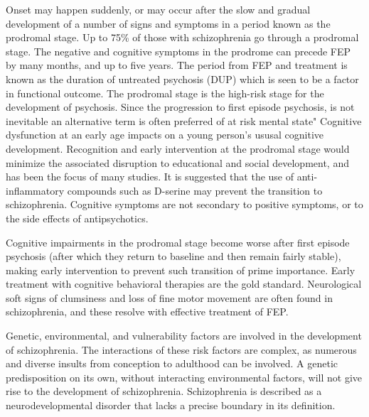 Onset may happen suddenly, or may occur after the slow and gradual
development of a number of signs and symptoms in a period known as the
prodromal stage. Up to 75\% of those with schizophrenia go through a
prodromal stage. The negative and cognitive symptoms in the prodrome can
precede FEP by many months, and up to five years. The period from FEP
and treatment is known as the duration of untreated psychosis (DUP)
which is seen to be a factor in functional outcome. The prodromal stage
is the high-risk stage for the development of psychosis. Since the
progression to first episode psychosis, is not inevitable an alternative
term is often preferred of at risk mental state" Cognitive dysfunction
at an early age impacts on a young person's ususal cognitive
development. Recognition and early intervention at the prodromal stage
would minimize the associated disruption to educational and social
development, and has been the focus of many studies. It is suggested
that the use of anti-inflammatory compounds such as D-serine may prevent
the transition to schizophrenia. Cognitive symptoms are not secondary to
positive symptoms, or to the side effects of antipsychotics.

Cognitive impairments in the prodromal stage become worse after first
episode psychosis (after which they return to baseline and then remain
fairly stable), making early intervention to prevent such transition of
prime importance. Early treatment with cognitive behavioral therapies
are the gold standard. Neurological soft signs of clumsiness and loss of
fine motor movement are often found in schizophrenia, and these resolve
with effective treatment of FEP.

Genetic, environmental, and vulnerability factors are involved in the
development of schizophrenia. The interactions of these risk factors are
complex, as numerous and diverse insults from conception to adulthood
can be involved. A genetic predisposition on its own, without
interacting environmental factors, will not give rise to the development
of schizophrenia. Schizophrenia is described as a neurodevelopmental
disorder that lacks a precise boundary in its definition.

